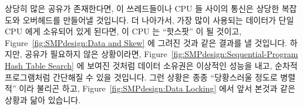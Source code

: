 상당히 많은 공유가 존재한다면, 이 쓰레드들이나 CPU 들 사이의 통신은 상당한
복잡도와 오버헤드를 만들어낼 것입니다.
더 나아가서, 가장 많이 사용되는 데이터가 단일 CPU 에게 소유되어 있게 된다면, 이
CPU 는 ``핫스팟'' 이 될 것이고, Figure~\ref{fig:SMPdesign:Data and Skew} 에
그려진 것과 같은 결과를 낼 것입니다.
하지만, 공유가 필요하지 않은 상황이라면,
Figure~\ref{fig:SMPdesign:Sequential-Program Hash Table Search} 에 보여진
것처럼 데이터 소유권은 이상적인 성능을 내고, 순차적 프로그램처럼 간단해질 수
있을 것입니다.
그런 상황은 종종 ``당황스러울 정도로 병렬적'' 이라 불리곤 하고,
Figure~\ref{fig:SMPdesign:Data Locking} 에서 앞서 본것과 같은 상황과 닮아
있습니다.

